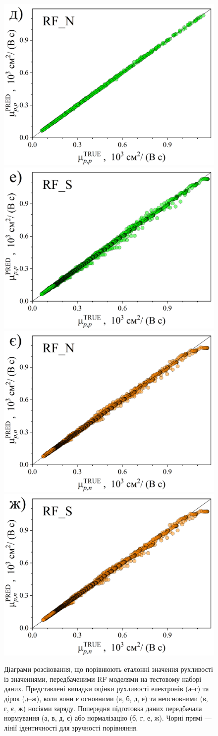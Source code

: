 \documentclass[12pt,a4paper,titlepage,oneside]{book}
\numberwithin{equation}{part}
\begin{document}
\begin{figure}
     \includegraphics[width=0.35\linewidth]{RFNpp.png}\kern 20pt
     \includegraphics[width=0.35\linewidth]{RFSpp.png}
     \includegraphics[width=0.35\linewidth]{RFNpn.png}\kern 20pt
     \includegraphics[width=0.35\linewidth]{RFSpn.png}
	  \caption{Діаграми розсіювання, що порівнюють еталонні значення рухливості із значеннями, передбаченими RF моделями
       на тестовому наборі даних.
       Представлені випадки оцінки рухливості електронів (а--г) та дірок (д--ж), коли вони є
       основними (а, б, д, е) та неосновними (в, г, є, ж) носіями заряду.
       Попередня підготовка даних передбачала нормування (а, в, д, є) або нормалізацію (б, г, е, ж).
       Чорні прямі --- лінії ідентичності для зручності порівняння.
}\label{figRF}
\end{figure}
\end{document}
